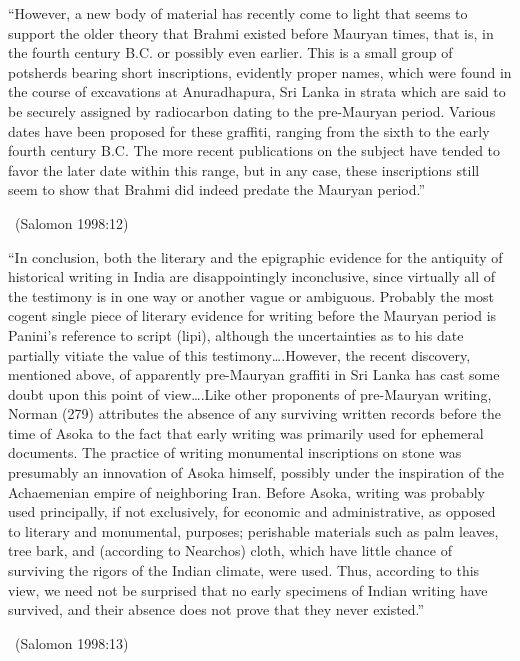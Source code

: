 \begin{myquote}
“However, a new body of material has recently come to light that seems to support the older theory that Brahmi existed before Mauryan times, that is, in the fourth century B.C. or possibly even earlier. This is a small group of potsherds bearing short inscriptions, evidently proper names, which were found in the course of excavations at Anuradhapura, Sri Lanka in strata which are said to be securely assigned by radiocarbon dating to the pre-Mauryan period. Various dates have been proposed for these graffiti, ranging from the sixth to the early fourth century B.C. The more recent publications on the subject have tended to favor the later date within this range, but in any case, these inscriptions still seem to show that Brahmi did indeed predate the Mauryan period.” 

~\hfill (Salomon 1998:12)
\end{myquote}

\begin{myquote}
“In conclusion, both the literary and the epigraphic evidence for the antiquity of historical writing in India are disappointingly inconclusive, since virtually all of the testimony is in one way or another vague or ambiguous. Probably the most cogent single piece of literary evidence for writing before the Mauryan period is Panini’s reference to script (lipi), although the uncertainties as to his date partially vitiate the value of this testimony….However, the recent discovery, mentioned above, of apparently pre-Mauryan graffiti in Sri Lanka has cast some doubt upon this point of view….Like other proponents of pre-Mauryan writing, Norman (279) attributes the absence of any surviving written records before the time of Asoka to the fact that early writing was primarily used for ephemeral documents. The practice of writing monumental inscriptions on stone was presumably an innovation of Asoka himself, possibly under the inspiration of the Achaemenian empire of neighboring Iran. Before Asoka, writing was probably used principally, if not exclusively, for economic and administrative, as opposed to literary and monumental, purposes; perishable materials such as palm leaves, tree bark, and (according to Nearchos) cloth, which have little chance of surviving the rigors of the Indian climate, were used. Thus, according to this view, we need not be surprised that no early specimens of Indian writing have survived, and their absence does not prove that they never existed.” 

~\hfill (Salomon 1998:13)
\end{myquote}


